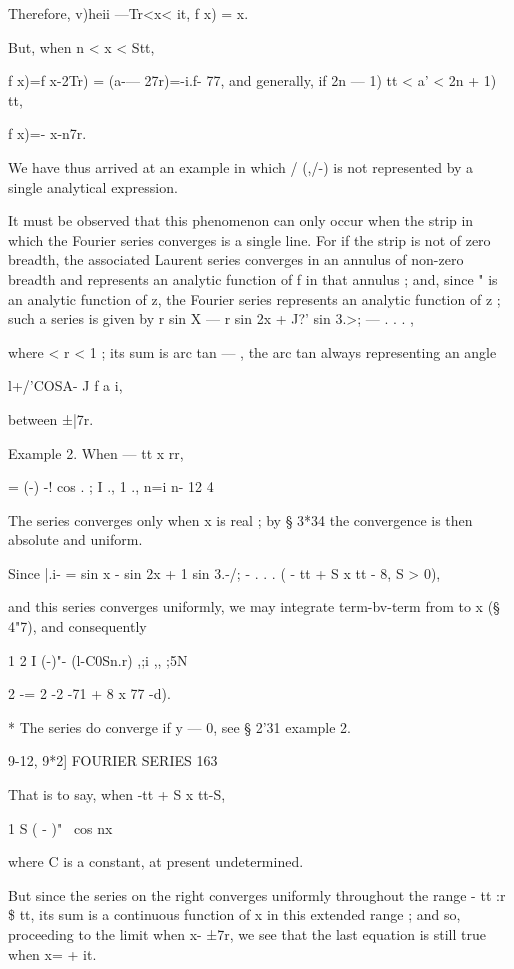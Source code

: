 Therefore, v)heii —Tr<x< it, f x) = x.

But, when n < x < Stt,

f x)=f x-2Tr) = (a-— 27r)=-i.f- 77, and generally, if 2n — 1) tt < a'
< 2n + 1) tt,

f x)=- x-n7r.

We have thus arrived at an example in which / (,/-) is not represented
by a single analytical expression.

It must be observed that this phenomenon can only occur when the strip
in which the Fourier series converges is a single line. For if the
strip is not of zero breadth, the associated Laurent series converges
in an annulus of non-zero breadth and represents an analytic function
of f in that annulus ; and, since " is an analytic function of z, the
Fourier series represents an analytic function of z ; such a series is
given by r sin X — r sin 2x + J?' sin 3.>; — . . . ,

where < r < 1 ; its sum is arc tan — , the arc tan always representing
an angle

l+/'COSA- J f a i,

between ±|7r.

Example 2. When — tt x rr,

= (-) -! cos . ; I ., 1 ., n=i n- 12 4

The series converges only when x is real ; by § 3*34 the convergence
is then absolute and uniform.

Since |.i- = sin x - sin 2x + 1 sin 3.-/; - . . . ( - tt + S x tt - 8,
S > 0),

and this series converges uniformly, we may integrate term-bv-term
from to x (§ 4"7), and consequently

1 2 I (-)"- (l-C0Sn.r) ,;i ,, ;5N

2 -= 2 -2 -71 + 8 x 77 -d).

* The series do converge if y — 0, see § 2'31 example 2.

9-12, 9*2] FOURIER SERIES 163

That is to say, when -tt + S x tt-S,

  1 S ( - )"~ cos nx

where C is a constant, at present undetermined.

But since the series on the right converges uniformly throughout the
range - tt :r \$ tt, its sum is a continuous function of x in this
extended range ; and so, proceeding to the limit when x- ±7r, we see
that the last equation is still true when x= + it.

